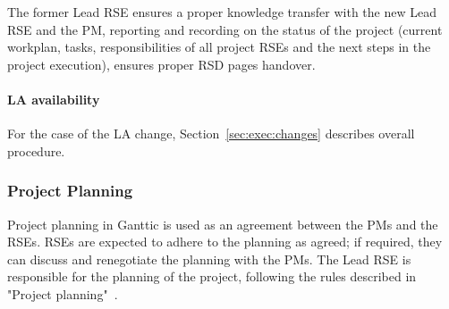 The former Lead RSE ensures a proper knowledge transfer with the new Lead RSE and the PM, 
reporting and recording on the status of the project (current workplan, tasks, responsibilities of all project RSEs 
and the next steps in the project execution), ensures proper RSD pages handover. 

\paragraph{LA availability} For the case of the LA change, Section~\ref{sec:exec:changes} describes overall procedure.

\subsubsection{Project Planning}
\label{init:planning}
Project planning in Ganttic is used as an agreement between the PMs and the RSEs. RSEs are expected to adhere to the
planning as agreed; if required, they can discuss and renegotiate the planning with the PMs.
The Lead RSE is responsible for the planning of the project, following the rules described in "Project planning"~\cite{intranet}.






